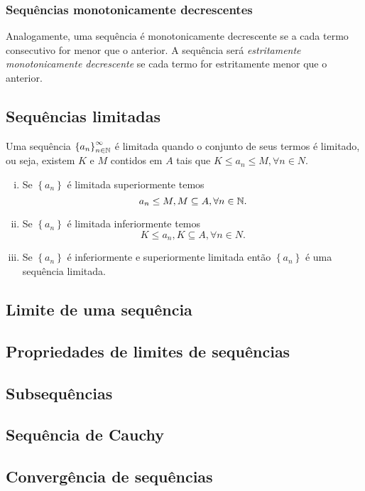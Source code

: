             \subsubsection{Sequências monotonicamente decrescentes}
               Analogamente, uma sequência é monotonicamente decrescente se a cada termo consecutivo for menor que o anterior. A sequência será \emph{estritamente monotonicamente decrescente} se cada termo for estritamente menor que o anterior.
      
   \subsection{Sequências limitadas}
      \begin{definition}
         Uma sequência $\left\{a_{n}\right\}^{\infty}_{n \in \mathbb{N}}$ é limitada quando o conjunto de seus termos é limitado, ou seja, existem $K$ e $M$ contidos em $A$ tais que $K \leq a_{n} \leq M, \forall n \in N$.
         \begin{enumerate}[i.]
            \item Se $\left\{a_{n}\right\}$ é limitada superiormente temos $$a_{n} \leq M, M \subseteq A,\forall n \in \mathbb{N}.$$
            \item Se $\left\{a_{n}\right\}$ é limitada inferiormente temos $$K \leq a_{n}, K \subseteq A, \forall n \in N.$$
            \item Se $\left\{a_{n}\right\}$ é inferiormente e superiormente limitada então $\left\{a_{n}\right\}$ é uma sequência limitada.
         \end{enumerate}
      \end{definition}
   \subsection{Limite de uma sequência}
   \subsection{Propriedades de limites de sequências}
   \subsection{Subsequências}
   \subsection{Sequência de Cauchy}

   \subsection{Convergência de sequências}
